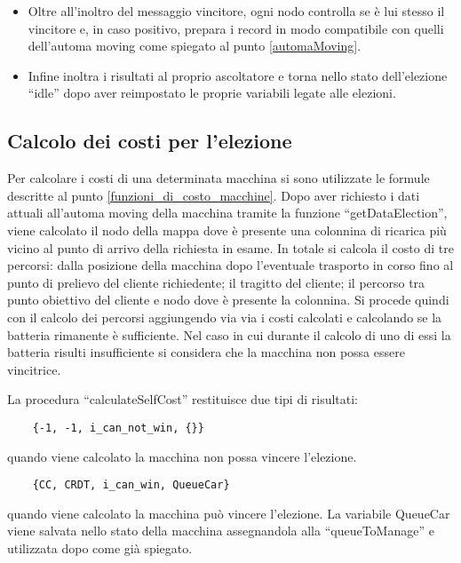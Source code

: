 \begin{itemize}
	\item Oltre all'inoltro del messaggio vincitore, ogni nodo controlla se è lui stesso il vincitore e, in caso positivo, prepara i record in modo compatibile con quelli dell'automa moving come spiegato al punto \ref{automaMoving}.

	\item Infine inoltra i risultati al proprio ascoltatore e torna nello stato dell'elezione ``idle'' dopo aver reimpostato le proprie variabili legate alle elezioni.
\end{itemize}

\subsection{Calcolo dei costi per l'elezione}\label{implementazione_calcolo_costi}
Per calcolare i costi di una determinata macchina si sono utilizzate le formule descritte al punto \ref{funzioni_di_costo_macchine}. Dopo aver richiesto i dati attuali all'automa moving della macchina tramite la funzione ``getDataElection'', viene calcolato il nodo della mappa dove è presente una colonnina di ricarica più vicino al punto di arrivo della richiesta in esame.
In totale si calcola il costo di tre percorsi: dalla posizione della macchina dopo l'eventuale trasporto in corso fino al punto di prelievo del cliente richiedente; il tragitto del cliente; il percorso tra punto obiettivo del cliente e nodo dove è presente la colonnina.
Si procede quindi con il calcolo dei percorsi aggiungendo via via i costi calcolati e calcolando se la batteria rimanente è sufficiente. Nel caso in cui durante il calcolo di uno di essi la batteria risulti insufficiente si considera che la macchina non possa essere vincitrice.

La procedura ``calculateSelfCost'' restituisce due tipi di risultati:
\begin{lstlisting}
	{-1, -1, i_can_not_win, {}}
\end{lstlisting}
quando viene calcolato la macchina non possa vincere l'elezione.

\begin{lstlisting}
	{CC, CRDT, i_can_win, QueueCar}
\end{lstlisting}
quando viene calcolato la macchina può vincere l'elezione. La variabile QueueCar viene salvata nello stato della macchina assegnandola alla ``queueToManage'' e utilizzata dopo come già spiegato.

